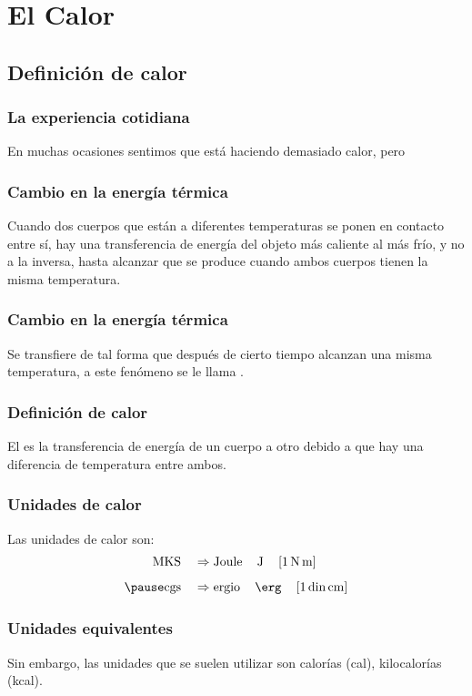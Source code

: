 \documentclass[14pt]{beamer}
\begin{document}
\section{El Calor}
\subsection{Definición de calor}

\begin{frame}
\frametitle{La experiencia cotidiana}
En muchas ocasiones sentimos que está haciendo demasiado calor, \pause pero 
\end{frame}
\begin{frame}
\frametitle{Cambio en la energía térmica}
Cuando dos cuerpos que están a diferentes temperaturas se ponen en contacto entre sí, \pause hay una transferencia de energía del objeto más caliente al más frío, y no a la inversa, \pause hasta alcanzar  que se produce cuando ambos cuerpos tienen la misma temperatura.
\end{frame}
\begin{frame}
\frametitle{Cambio en la energía térmica}
Se transfiere de tal forma que después de cierto tiempo alcanzan una misma temperatura, a este fenómeno se le llama .
\end{frame}
\begin{frame}
\frametitle{Definición de calor}
El  es la transferencia de energía de un cuerpo a otro debido a que hay una
diferencia de temperatura entre ambos.
\end{frame}
\begin{frame}
\frametitle{Unidades de calor}
Las unidades de calor son:
\pause
\begin{eqnarray*}
\begin{aligned}
\text{MKS} \quad &\Rightarrow \text{Joule} \, \quad \unit{\joule}  \quad \left[ \SI{1}{\newton\metre} \right] \\[0.5em] \pause
\text{cgs} \quad &\Rightarrow \text{ergio} \, \quad \unit{\erg} \quad \left[ 1 \, \text{din} \, \unit{\centi\metre} \right]
\end{aligned}
\end{eqnarray*}
\end{frame}
\begin{frame}
\frametitle{Unidades equivalentes}
Sin embargo, las unidades que se suelen utilizar son calorías (cal), kilocalorías (kcal).
\end{frame}
\end{document}
